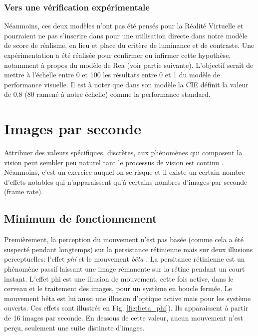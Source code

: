 	\subsubsection{Vers une vérification expérimentale}
	\par Néanmoins, ces deux modèles n'ont pas été pensés pour la Réalité Virtuelle et pourraient ne pas s'inscrire dans pour une utilisation directe dans notre modèle de score de réalisme, en lieu et place du critère de luminance et de contraste. Une expérimentation a été réalisée pour confirmer ou infirmer cette hypothèse, notamment à propos du modèle de Rea (voir partie suivante). L'objectif serait de mettre à l'échelle entre 0 et 100 les résultats entre 0 et 1 du modèle de performance visuelle. Il est à noter que dans son modèle la CIE définit la valeur de 0.8 (80 ramené à notre échelle) comme la performance standard.
	
	\section{Images par seconde}	
	\par Attribuer des valeurs spécifiques, discrètes, aux phénomènes qui composent la vision peut sembler peu naturel tant le processus de vision est continu \citep{bear_neurosciences:_2007}. Néanmoins, c'est un exercice auquel on se risque et il existe un certain nombre d'effets notables qui n'apparaissent qu'à certains nombres d'images par seconde (frame rate).
	
	\subsection{Minimum de fonctionnement}
	\par Premièrement, la perception du mouvement n'est pas basée (comme cela a été suspecté pendant longtemps) sur la persistance rétinienne mais sur deux illusions perceptuelles: l'effet \textit{phi} et le mouvement \textit{bêta} \citep{de_lauretis_flicker_1980}. La persitance rétinienne est un phénomène passif laissant une image rémanente sur la rétine pendant un court instant. L'effet phi est une illusion de mouvement, cette fois active, dans le cerveau et le traitement des images, pour un système en boucle fermée. Le mouvement bêta est lui aussi une illusion d'optique active mais pour les système ouverts. Ces effets sont illustrés en Fig. \ref{fig:beta_phi}). Ils apparaissent à partir de 16 images par seconde. En dessous de cette valeur, aucun mouvement n'est perçu, seulement une suite distincte d'images.
	
